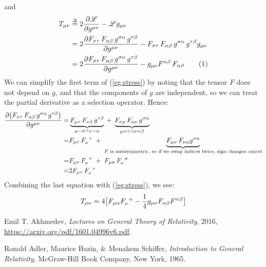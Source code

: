 \documentclass[]{article}
\newcommand{\Lagr}{\mathscr{L}}
\newcommand\numberthis{\addtocounter{equation}{1}\tag{\theequation}}
\begin{document}
and
\begin{align*}
T_{\mu\nu}&\overset{\Delta}{=}2 \frac{\partial \Lagr}{\partial g^{\mu\nu}} - \Lagr g_{\mu\nu}\\
&=2\frac{\partial F_{\sigma\tau}\, F_{\alpha\beta} \, g^{\sigma\alpha} \, g^{\tau\beta}}{\partial g^{\mu\nu}} - F_{\sigma\tau}\, F_{\alpha\beta} \, g^{\sigma\alpha} \, g^{\tau\beta} g_{\mu\nu} \\
&=2\frac{\partial F_{\sigma\tau}\, F_{\alpha\beta} \, g^{\sigma\alpha} \, g^{\tau\beta}}{\partial g^{\mu\nu}} - g_{\mu\nu} F^{\alpha\beta}\, F_{\alpha\beta} \numberthis \label {eg:stress}
\end{align*}
We can simplify the first term of (\ref{eg:stress}) by noting that the tensor $F$ does not depend on $g$, and that the components of $g$ are independent, so we can treat the partial derivative as a selection operator. Hence:
\begin{align*}
\frac{\partial \big(F_{\sigma\tau}\, F_{\alpha\beta} \, g^{\sigma\alpha} \, g^{\tau\beta}\big)}{\partial g^{\mu\nu}} =& \underbrace{F_{\mu\tau}\, F_{\nu\beta} \,  g^{\tau\beta}}_{\mu=\sigma \land \nu=\alpha} \: + \; \underbrace{F_{\sigma\mu}\, F_{\alpha\nu} \, g^{\sigma\alpha}}_{\mu=\tau \land \nu=\beta} \\
=& F_{\mu\tau}\, F\indices{_\nu^\tau} \; + \; \underbrace{F_{\mu\sigma}\, F_{\nu\alpha} g^{\sigma\alpha}}_\text{$F$ is antisymmetric, so if we swap indices twice, sign changes cancel} \\
=& F_{\mu\tau}\, F\indices{_\nu^\tau} \; + \; F_{\mu\sigma}\, F\indices{_\nu^\sigma} \\
=& 2 F_{\mu\tau}\, F\indices{_\nu^\tau} 
\end{align*}
Combining the last equation with (\ref{eg:stress}), we see:
$$T_{\mu\nu} = 4\big[F_{\mu\alpha} F\indices{_\nu^\alpha} - \frac{1}{4}g_{\mu\nu} F_{\alpha\beta} F^{\alpha\beta}\big]$$

\begin{thebibliography}{9}

Emil T. Akhmedev,
\emph{Lectures on General Theory of Relativity},
2016,
\url{https://arxiv.org/pdf/1601.04996v6.pdf}.

Ronald Adler, Maurice Bazin, \& Menahem Schiffer,
\emph{Introduction to General Relativity},
McGraw-Hill Book Company, New York,
1965.
\end{thebibliography}
\end{document}
